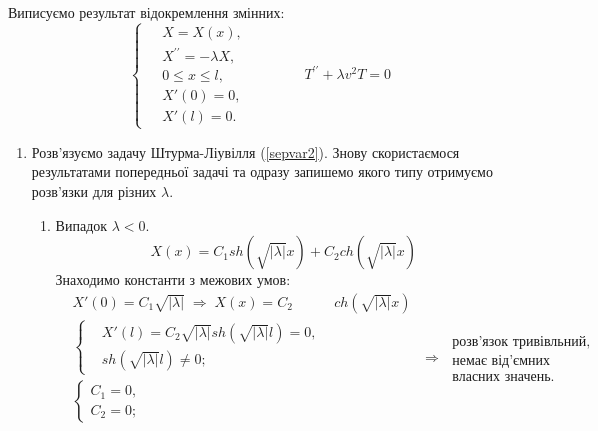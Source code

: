 \documentclass[a4paper, 14pt]{extreport}
\begin{document}
Виписуємо результат відокремлення змінних:
\begin{equation} \label{sepvar2}
    \left\{ \begin{aligned}
        \;&X = X(x), \\
          &X^{\prime\prime} = -\lambda X, \\
          &0 \leq x \leq l, \\
          &X'(0) = 0, \\ 
          &X'(l) = 0. 
    \end{aligned} \right.
    \qquad\qquad
    T^{\prime\prime} + \lambda v^2 T = 0
\end{equation}

\begin{enumerate}
    \item[] Розв'язуємо задачу Штурма-Ліувілля (\ref{sepvar2}). Знову скористаємося результатами попередньої задачі та одразу запишемо якого типу отримуємо розв'язки для різних $\lambda$.
    \begin{enumerate}[wide, labelindent=0pt]
        
        \item Випадок $\lambda < 0$. 
        \begin{equation*}
            X(x) = C_1 sh(\sqrt{|\lambda|}x) + C_2 ch({\sqrt{|\lambda|}x})
        \end{equation*}
        Знаходимо константи з межових умов:
        \begin{equation*}
            \begin{aligned}
                &X'(0) = C_1\sqrt{|\lambda|}
                \;\Rightarrow\;
                X(x) = C_2 &ch(\sqrt{|\lambda|}x)\\
                &\left\{ \begin{aligned}
                    &X'(l) = C_2\sqrt{|\lambda|} sh(\sqrt{|\lambda|}l) = 0, \\
                    &sh(\sqrt{|\lambda|}l) \neq 0;
                \end{aligned} \right.&\\
                &\left\{ \begin{aligned}
                    C_1 = 0, \\ 
                    C_2 = 0;
                \end{aligned} \right. \qquad\qquad\qquad\qquad&
            \end{aligned}
            \;\Rightarrow\;
            \begin{aligned}
                \text{розв'язок тривівльний,}\\
                \text{немає від'ємних}\\
                \text{власних значень.}
            \end{aligned}
        \end{equation*}


\end{enumerate}
\end{enumerate}
\end{document}
